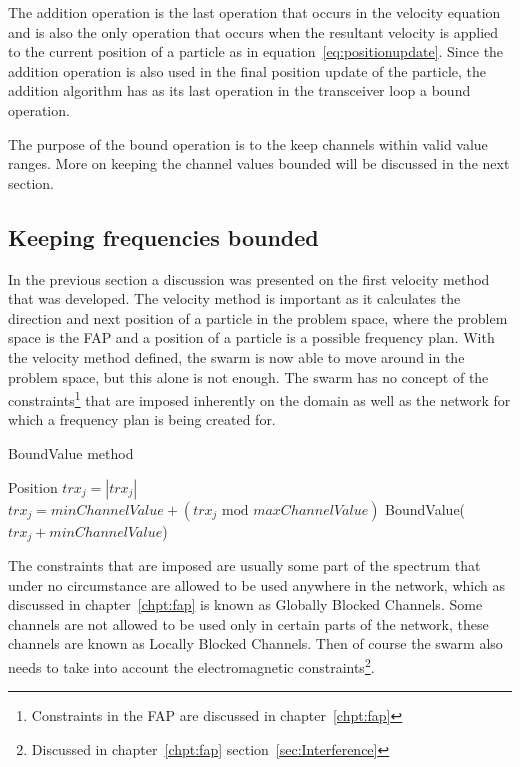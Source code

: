 The addition operation is the last operation that occurs in the velocity equation and is also the only operation that occurs when the resultant velocity is applied to the current position of a particle as in equation~\ref{eq:positionupdate}. Since the addition operation is also used in the final position update of the particle, the addition algorithm has as its last operation in the transceiver loop a bound operation. 

The purpose of the bound operation is to the keep channels within valid value ranges. More on keeping the channel values bounded will be discussed in the next section.
\subsection{Keeping frequencies bounded}
In the previous section a discussion was presented on the first velocity method that was developed. The velocity method is important as it calculates the direction and next position of a particle in the problem space, where the problem space is the FAP and a position of a particle is a possible frequency plan. With the velocity method defined, the swarm is now able to move around in the problem space, but this alone is not enough. The swarm has no concept of the constraints\footnote{Constraints in the FAP are discussed in chapter~\ref{chpt:fap}} that are imposed inherently on the domain as well as the network for which a frequency plan is being created for.
\begin{algorithm}
\caption{BoundValue method}
\label{alg:boundvalue}
\begin{algorithmic}[1]
	\REQUIRE Position
			\STATE $trx_j = \left|trx_j\right|$
				\STATE $trx_j = minChannelValue + (\text{$trx_j$ mod $maxChannelValue$})$
			\ELSE 
					\STATE BoundValue($trx_j + minChannelValue$)
				\ENDIF
			\ENDIF
		\ENDFOR
	\ENDFOR
\end{algorithmic}
\end{algorithm}
The constraints that are imposed are usually some part of the spectrum that under no circumstance are allowed to be used anywhere in the network, which as discussed in chapter~\ref{chpt:fap} is known as Globally Blocked Channels. Some channels are not allowed to be used only in certain parts of the network, these channels are known as Locally Blocked Channels. Then of course the swarm also needs to take into account the electromagnetic constraints\footnote{Discussed in chapter~\ref{chpt:fap} section~\ref{sec:Interference}}.

